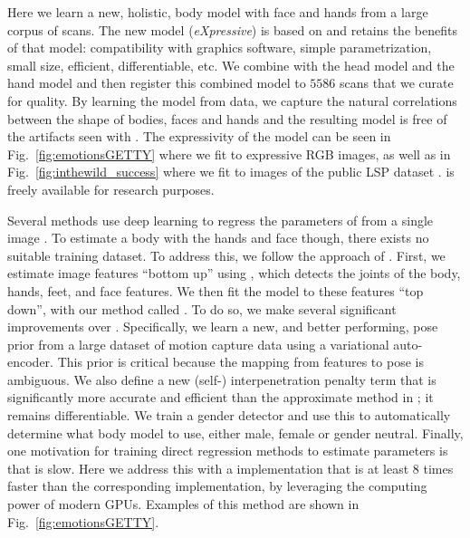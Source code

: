 Here we learn a new, holistic, body model with face and hands from a large corpus of \threeD scans.
The new \emph{\smplHF} model (\emph{\smpl eXpressive}) is based on \smpl and retains the benefits of that model: compatibility with graphics software, simple parametrization, small size, efficient, differentiable, etc.
We combine \smpl with the \flame head model \cite{li2017learning} and the \mano hand model \cite{romero2017embodied} and then register this combined model to $5586$ \threeD scans that we curate for quality.
By learning the model from data, we capture the natural correlations between the shape of bodies, faces and hands and the resulting model is free of the artifacts seen with \frank.
The expressivity of the model can be seen in Fig.~\ref{fig:emotionsGETTY} where we fit \smplHF to  expressive RGB images, as well as in Fig.~\ref{fig:inthewild_success} where we fit \smplHF to images of the public LSP dataset \cite{johnson2010clustered}. 
\smplHF is freely available for research purposes.

Several methods use deep learning to regress the parameters of \smpl from a single image \cite{kanazawa2018end,omran2018neural,pavlakos2018learning}. 
To estimate a \threeD body with the hands and face though, there exists no suitable training dataset. 
To address this, we follow the approach of \smplify. 
First, we  estimate \twoD image features ``bottom up'' using \openpose \cite{cao2017realtime,simon2017hand,wei2016convolutional}, which detects the joints of the body, hands, feet, and face features.
We then fit the \smplHF model to these \twoD features ``top down'', with our method called \emph{\smplifyPP}. 
To do so, we make several significant improvements over \smplify.
Specifically, we learn a new, and better performing, pose prior from a large dataset of motion capture data \citeMOSH using a variational auto-encoder.
This prior is critical because the mapping from \twoD features to \threeD pose is ambiguous.
We also define a new (self-) interpenetration penalty term that is significantly more accurate and efficient than the approximate method in \smplify; it remains differentiable.
We train a gender detector and use this to automatically determine what body model to use, either male, female or gender neutral.
Finally, one motivation for training direct regression methods to estimate \smpl parameters is that \smplify is slow.
Here we address this with a \pytorch implementation that is at least $8$ times faster than the corresponding \chumpy implementation, by leveraging the computing power of modern GPUs.
Examples of this \smplifyPP method are shown in Fig.~\ref{fig:emotionsGETTY}.

